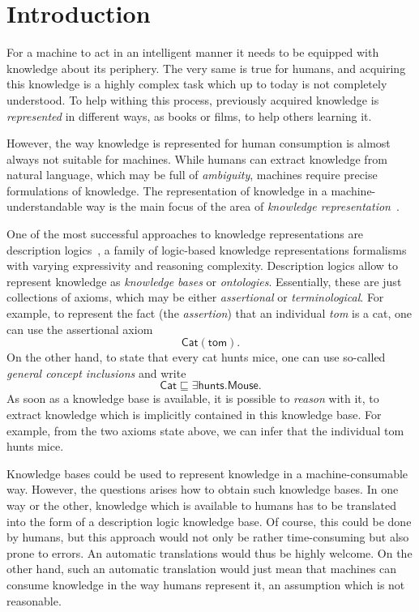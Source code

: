 
\chapter{Introduction}
\label{cha:introduction}

For a machine to act in an intelligent manner it needs to be equipped with knowledge about
its periphery.  The very same is true for humans, and acquiring this knowledge is a highly
complex task which up to today is not completely understood.  To help withing this
process, previously acquired knowledge is \emph{represented} in different ways, \eg as
books or films, to help others learning it.

However, the way knowledge is represented for human consumption is almost always not
suitable for machines.  While humans can extract knowledge from natural language, which
may be full of \emph{ambiguity}, machines require precise formulations of knowledge.  The
representation of knowledge in a machine-understandable way is the main focus of the area
of \emph{knowledge representation}~\cite{KRhandbook}.

One of the most successful approaches to knowledge representations are description
logics~\cite{DLhandbook}, a family of logic-based knowledge representations formalisms
with varying expressivity and reasoning complexity.  Description logics allow to represent
knowledge as \emph{knowledge bases} or \emph{ontologies}.  Essentially, these are just
collections of axioms, which may be either \emph{assertional} or \emph{terminological}.
For example, to represent the fact (the \emph{assertion}) that an individual \emph{tom} is
a cat, one can use the assertional axiom
\begin{equation}
  \label{eq:14}
  \mathsf{Cat}(\mathsf{tom}).
\end{equation}
On the other hand, to state that every cat hunts mice, one can use so-called \emph{general
concept inclusions} and write
\begin{equation}
  \label{eq:15}
  \mathsf{Cat} \sqsubseteq \exists \mathsf{hunts}. \mathsf{Mouse}.
\end{equation}
As soon as a knowledge base is available, it is possible to \emph{reason} with it, \ie to
extract knowledge which is implicitly contained in this knowledge base.  For example, from
the two axioms state above, we can infer that the individual \textsf{tom} hunts mice.

Knowledge bases could be used to represent knowledge in a machine-consumable way.
However, the questions arises how to obtain such knowledge bases.  In one way or the
other, knowledge which is available to humans has to be translated into the form of a
description logic knowledge base.  Of course, this could be done by humans, but this
approach would not only be rather time-consuming but also prone to errors.  An automatic
translations would thus be highly welcome.  On the other hand, such an automatic
translation would just mean that machines can consume knowledge in the way humans
represent it, an assumption which is not reasonable.

